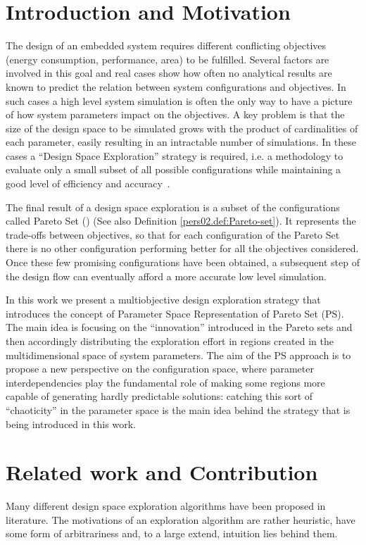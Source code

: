 
\section{Introduction and Motivation}

The design of an embedded system requires different conflicting
objectives (energy consumption, performance, area) to be fulfilled.
Several factors are involved in this goal and real cases show how
often no analytical results are known to predict the relation between
system configurations and objectives. In such cases a high level
system simulation is often the only way to have a picture of how system
parameters impact on the objectives.  A key problem is that the size
of the design space to be simulated grows with the product of
cardinalities of each parameter, easily resulting in an intractable number
of simulations. In these cases a ``Design Space
Exploration'' strategy is required, i.e. a methodology to evaluate
only a small subset of all possible configurations while maintaining a
good level of efficiency and accuracy~\cite{surviving_soc}.

The final result of a design space exploration is a subset of the
configurations called Pareto Set (\cite{pareto}) (See also Definition
\ref{pers02.def:Pareto-set}). It represents the trade-offs between
objectives, so that for each configuration of the Pareto Set there is no
other configuration performing better for all the objectives
considered. Once these few promising configurations have been obtained, a
subsequent step of the design flow can eventually afford a more
accurate low level simulation.

In this work we present a multiobjective design exploration strategy
that introduces the concept of Parameter Space Representation of
Pareto Set (PS). The main idea is focusing on the ``innovation''
introduced in the Pareto sets and then accordingly distributing the
exploration effort in regions created in the multidimensional space of
system parameters. The aim of the PS approach is to propose a new
perspective on the configuration space, where parameter
interdependencies play the fundamental role of making some regions
more capable of generating hardly predictable solutions: catching this
sort of ``chaoticity'' in the parameter space is the main idea behind
the strategy that is being introduced in this work.

\section{Related work and Contribution}
\label{sec:Related-work}
Many different design space exploration algorithms have been proposed
in literature.  The motivations of an exploration
algorithm are rather heuristic, have some form of arbitrariness and,
to a large extend, intuition lies behind them.

